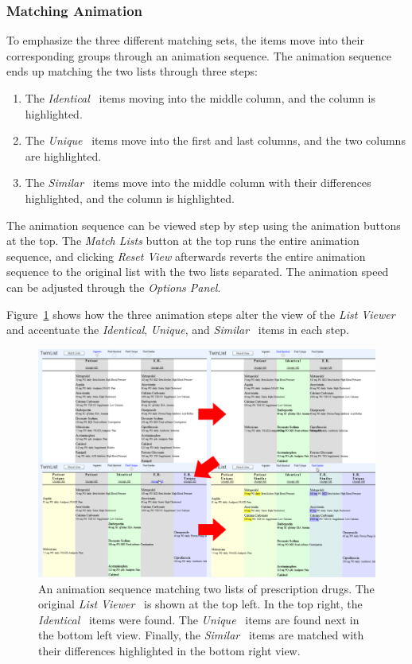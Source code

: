 \documentclass{chi2009}
\newcommand{\ListViewer}{\textit{List Viewer}}
\newcommand{\Options}{\textit{Options Panel}}
\newcommand{\Similar}{\textit{Similar}}
\newcommand{\Identical}{\textit{Identical}}
\newcommand{\Unique}{\textit{Unique}}
\begin{document}
\subsubsection{Matching Animation}
To emphasize the three different matching sets, the items move into their corresponding groups through an animation sequence. The animation sequence ends up matching the two lists through three steps:
\begin{enumerate}
\item The \Identical~ items moving into the middle column, and the column is highlighted.
\item The \Unique~ items move into the first and last columns, and the two columns are highlighted.
\item The \Similar~ items move into the middle column with their differences highlighted, and the column is highlighted.
\end{enumerate}

The animation sequence can be viewed step by step using the animation buttons at the top. The \textit{Match Lists} button at the top runs the entire animation sequence, and clicking \textit{Reset View} afterwards reverts the entire animation sequence to the original list with the two lists separated. The animation speed can be adjusted through the \Options.

Figure~\ref{fig:animation} shows how the three animation steps alter the view of the \ListViewer~ and accentuate the \Identical, \Unique, and \Similar~ items in each step.

\begin{figure}[t]
\begin{center}
\includegraphics[width=1\linewidth]{img/anim_arrows.png}
\end{center}
   \caption{An animation sequence matching two lists of prescription drugs. The original \ListViewer~ is shown at the top left. In the top right, the \Identical~ items were found. The \Unique~ items are found next in the bottom left view. Finally, the \Similar~ items are matched with their differences highlighted in the bottom right view.}
   \label{fig:animation}
\end{figure}
\end{document}
